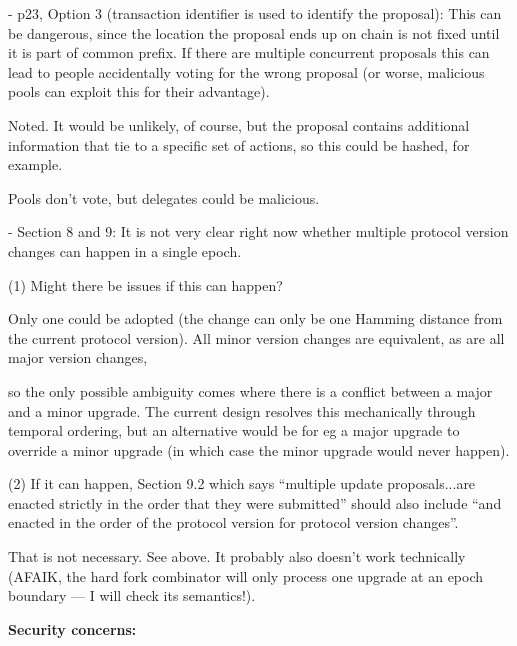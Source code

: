 \documentclass{article}
\begin{document}
\vspace{12pt}
- p23, Option 3 (transaction identifier is used to identify the proposal): This 
can be dangerous, since the location the proposal ends up on chain is not fixed 
until it is part of common prefix. If there are multiple concurrent proposals this 
can lead to people accidentally voting for the wrong proposal (or worse, malicious 
pools can exploit this for their advantage).

\vspace{12pt}
{\color{color02} Noted.   It would be unlikely, of course, but the proposal contains 
additional information that tie to a specific set of actions, so this could be 
hashed, for example.}

{\color{color02} Pools don't vote, but delegates could be malicious.}

\vspace{12pt}
- Section 8 and 9: It is not very clear right now whether multiple protocol version 
changes can happen in a single epoch.

\parindent=18pt
(1) Might there be issues if this can happen?

\vspace{12pt}
\parindent=0pt
{\color{color02} Only one could be adopted (the change can only be one Hamming 
distance from the current protocol version).  All minor version changes are equivalent, 
as are all major version changes,}

{\color{color02} so the only possible ambiguity comes where there is a conflict 
between a major and a minor upgrade.  The current design resolves this mechanically 
through temporal ordering, but an alternative would be for eg a major upgrade to 
override a minor upgrade (in which case the minor upgrade would never happen).}

\vspace{12pt}
\parindent=18pt
(2) If it can happen, Section 9.2 which says ``multiple update proposals...are 
enacted strictly in the order that they were submitted'' should also include ``and 
enacted in the order of the protocol version for protocol version changes''.

\vspace{12pt}
\parindent=0pt
{\color{color02} That is not necessary.  See above.  It probably also doesn't work 
technically (AFAIK, the hard fork combinator will only process one upgrade at an 
epoch boundary --- I will check its semantics!).}

\vspace{24pt}
\begin{center}
\textbf{Security concerns:}
\end{center}
\end{document}
